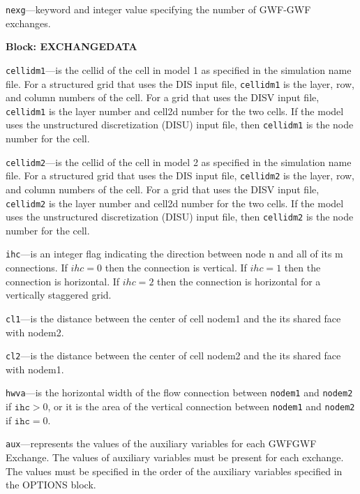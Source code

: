 \begin{description}
\item \texttt{nexg}---keyword and integer value specifying the number of GWF-GWF exchanges.

\end{description}
\item \textbf{Block: EXCHANGEDATA}

\begin{description}
\item \texttt{cellidm1}---is the cellid of the cell in model 1 as specified in the simulation name file. For a structured grid that uses the DIS input file, \texttt{cellidm1} is the layer, row, and column numbers of the cell.   For a grid that uses the DISV input file, \texttt{cellidm1} is the layer number and cell2d number for the two cells.  If the model uses the unstructured discretization (DISU) input file, then \texttt{cellidm1} is the node number for the cell.

\item \texttt{cellidm2}---is the cellid of the cell in model 2 as specified in the simulation name file. For a structured grid that uses the DIS input file, \texttt{cellidm2} is the layer, row, and column numbers of the cell.   For a grid that uses the DISV input file, \texttt{cellidm2} is the layer number and cell2d number for the two cells.  If the model uses the unstructured discretization (DISU) input file, then \texttt{cellidm2} is the node number for the cell.

\item \texttt{ihc}---is an integer flag indicating the direction between node n and all of its m connections. If $ihc=0$ then the connection is vertical.  If $ihc=1$ then the connection is horizontal. If $ihc=2$ then the connection is horizontal for a vertically staggered grid.

\item \texttt{cl1}---is the distance between the center of cell nodem1 and the its shared face with nodem2.

\item \texttt{cl2}---is the distance between the center of cell nodem2 and the its shared face with nodem1.

\item \texttt{hwva}---is the horizontal width of the flow connection between \texttt{nodem1} and \texttt{nodem2} if $\texttt{ihc} > 0$, or it is the area of the vertical connection between \texttt{nodem1} and \texttt{nodem2} if $\texttt{ihc} = 0$.

\item \texttt{aux}---represents the values of the auxiliary variables for each GWFGWF Exchange. The values of auxiliary variables must be present for each exchange. The values must be specified in the order of the auxiliary variables specified in the OPTIONS block.

\end{description}

